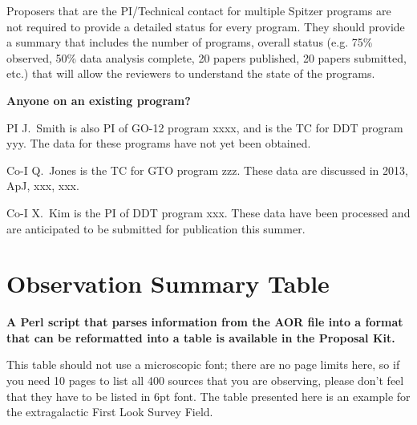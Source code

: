 \documentclass[letterpaper,12pt]{article}
\begin{document}
Proposers that are the PI/Technical contact for multiple Spitzer programs 
are not required to provide a detailed status for every program. They 
should provide a summary that includes the number of programs, overall 
status (e.g. 75\% observed, 50\% data analysis complete, 20 papers published, 
20 papers submitted, etc.) that will allow the reviewers to understand 
the state of the programs.\newline

\textbf{Anyone on an existing program?}

PI J.\ Smith is also PI of GO-12 program xxxx, and is the TC for
DDT program yyy.  The data for these programs have not yet been
obtained.

Co-I Q.\ Jones is the TC for GTO program zzz.  These data are
discussed in 2013, ApJ, xxx, xxx.

Co-I X.\ Kim is the PI of DDT program xxx.  These data have been
processed and are anticipated to be submitted for publication
this summer.\newline


\section{Observation Summary Table}


{\bf A Perl script that parses information from the AOR file into 
a format that can be reformatted into a table is available in the Proposal Kit.}\newline

This table should not use a microscopic font; there are no page
limits here, so if you need 10 pages to list all 400 sources that
you are observing, please don't feel that they have to be listed
in 6pt font. The table presented here is an example for the extragalactic 
First Look Survey Field.\newline
\end{document}
